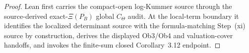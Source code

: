 \begin{proof}
  Lean first carries the compact-open log-Kummer source through the
  source-derived exact-\(\Xi(P_B)\) global \(C_\Theta\) audit.  At the
  local-term boundary it identifies the localized determinant source with the
  formula-matching Step~(xi) source by construction, derives the displayed
  Ob3/Ob4 and valuation-cover handoffs, and invokes the finite-sum closed
  Corollary~3.12 endpoint.
\end{proof}
